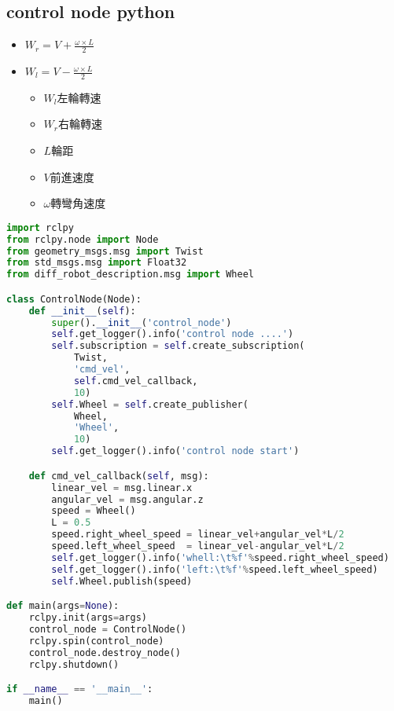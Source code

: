 \subsection{control node python}
\begin{itemize}
    \item $W_r = V+\frac{\omega \times L}{2}$
    \item $W_l = V-\frac{\omega \times L}{2}$
    \begin{itemize}
        \item $W_l$左輪轉速
        \item $W_r$右輪轉速
        \item $L$輪距
        \item $V$前進速度
        \item $\omega$轉彎角速度
    \end{itemize}
\end{itemize}
\begin{lstlisting}[language=Python, caption=control node]
import rclpy
from rclpy.node import Node
from geometry_msgs.msg import Twist
from std_msgs.msg import Float32
from diff_robot_description.msg import Wheel

class ControlNode(Node):
    def __init__(self):
        super().__init__('control_node')
        self.get_logger().info('control node ....')
        self.subscription = self.create_subscription(
            Twist,
            'cmd_vel',
            self.cmd_vel_callback,
            10)
        self.Wheel = self.create_publisher(
            Wheel,
            'Wheel',
            10)
        self.get_logger().info('control node start')

    def cmd_vel_callback(self, msg):
        linear_vel = msg.linear.x
        angular_vel = msg.angular.z
        speed = Wheel()
        L = 0.5
        speed.right_wheel_speed = linear_vel+angular_vel*L/2
        speed.left_wheel_speed  = linear_vel-angular_vel*L/2
        self.get_logger().info('whell:\t%f'%speed.right_wheel_speed)
        self.get_logger().info('left:\t%f'%speed.left_wheel_speed)
        self.Wheel.publish(speed)

def main(args=None):
    rclpy.init(args=args)
    control_node = ControlNode()
    rclpy.spin(control_node)
    control_node.destroy_node()
    rclpy.shutdown()

if __name__ == '__main__':
    main()
\end{lstlisting}

